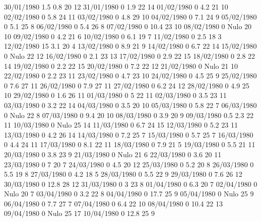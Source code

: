30/01/1980  1.5    0.8    20     12 
31/01/1980  0      1.9    22     14 
01/02/1980  0      4.2    21     10 
02/02/1980  0      5.8    24     11 
03/02/1980  0      4.8    29     10 
04/02/1980  0      7.1    24     9 
05/02/1980  0      5.1    25     8 
06/02/1980  0      5.4    26     8 
07/02/1980  0      10.4   23     10 
08/02/1980  0     Nulo    20     10 
09/02/1980  0      4.2    21     6 
10/02/1980  0      6.1    19     7 
11/02/1980  0      2.5    18     3 
12/02/1980  15     3.1    20     4 
13/02/1980  0      8.9    21     9 
14/02/1980  0      6.7    22     14 
15/02/1980  0     Nulo    22     12 
16/02/1980  0      2.1    23     13 
17/02/1980  0      2.9    22     15 
18/02/1980  0      2.8    22     14 
19/02/1980  0      2.2    22     15 
20/02/1980  0      7.2    22     12 
21/02/1980  0     Nulo    21     10 
22/02/1980  0      2.2    23     11 
23/02/1980  0      4.7    23     10 
24/02/1980  0      4.5    25     9 
25/02/1980  0      7.6    27     11 
26/02/1980  0      7.9    27     11 
27/02/1980  0      6.2    24     12 
28/02/1980  0      4.9    25     10 
29/02/1980  0      1.6    26     11 
01/03/1980  0      5      22     11 
02/03/1980  0      3.5    23     11 
03/03/1980  0      3.2    22     14 
04/03/1980  0      3.5    20     10 
05/03/1980  0      5.8    22     7 
06/03/1980  0     Nulo    22     8 
07/03/1980  0      9.4    20     10 
08/03/1980  0      3.9    20     9 
09/03/1980  0.5    2.3    22     11 
10/03/1980  0     Nulo    25     14 
11/03/1980  0      6.7    24     15 
12/03/1980  0      5.2    23     11 
13/03/1980  0      4.2    26     14 
14/03/1980  0      7.2    25     7 
15/03/1980  0      5.7    25     7 
16/03/1980  0      4.4    24     11 
17/03/1980  0      8.1    22     11 
18/03/1980  0      7.9    21     5 
19/03/1980  0      5.5    21     11 
20/03/1980  0      3.8    23     9 
21/03/1980  0     Nulo    21     6 
22/03/1980  0      3.6    20     11 
23/03/1980  0      7      20     7 
24/03/1980  0      4.5    20     12 
25/03/1980  0      5.2    20     8 
26/03/1980  0      5.5    19     8 
27/03/1980  0      4.2    18     5 
28/03/1980  0      5.5    22     9 
29/03/1980  0      7.6    26     12 
30/03/1980  0      12.8   28     12 
31/03/1980  0      3      23     8 
01/04/1980  0      6.3    20     7 
02/04/1980  0     Nulo    20     7 
03/04/1980  0      3.2    22     8 
04/04/1980  0      17.7   25     9 
05/04/1980  0     Nulo    25     9 
06/04/1980  0      7.7    27     7 
07/04/1980  0      6.4    22     10 
08/04/1980  0      10.4   22     13 
09/04/1980  0     Nulo    25     17 
10/04/1980  0      12.8   25     9 
